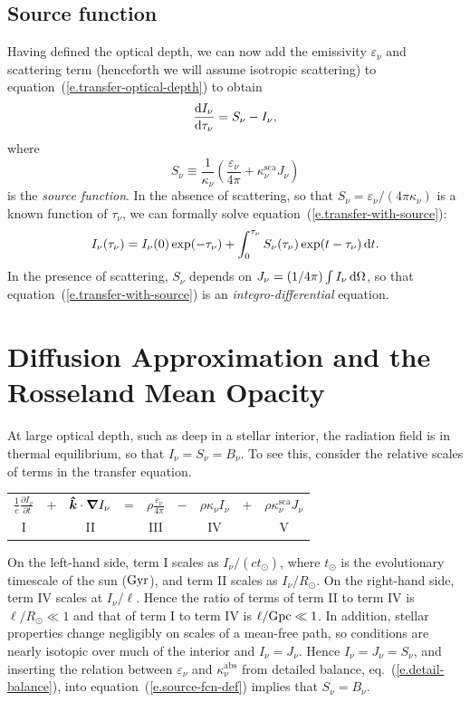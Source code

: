 \subsection{Source function}

Having defined the optical depth, we can now add the emissivity $\varepsilon_{\nu}$ and scattering term (henceforth we will assume isotropic scattering) to equation~(\ref{e.transfer-optical-depth}) to obtain
\begin{equation}\label{e.transfer-with-source}
\frac{\mathrm{d} I_{\nu}}{\mathrm{d} \tau_{\nu}} = S_{\nu}-I_{\nu},
\end{equation}
where 
\begin{equation}\label{e.source-fcn-def}
S_{\nu} \equiv \frac{1}{\kappa_{\nu}}\left(\frac{\varepsilon_{\nu}}{4\pi} + \kappa_{\nu}^{\mathrm{sca}}J_{\nu}\right)
\end{equation}
is the \emph{source function}. In the absence of scattering, so that $S_{\nu} = \varepsilon_{\nu}/(4\pi\kappa_{\nu})$ is a known function of $\tau_{\nu}$,
we can formally solve equation~(\ref{e.transfer-with-source}):
\[ I_{\nu}(\tau_{\nu}) = I_{\nu}(0)\exp(-\tau_{\nu}) + \int_{0}^{\tau_{\nu}} S_{\nu}(\tau_{\nu}) \exp(t-\tau_{\nu})\,\mathrm{d} t. \]
In the presence of scattering, $S_{\nu}$ depends on $J_{\nu} = (1/4\pi)\int I_{\nu}\,\mathrm{d}\Omega$, so that equation~(\ref{e.transfer-with-source}) is an \emph{integro-differential} equation.

\section[Diffusion Approximation]{Diffusion Approximation and the Rosseland Mean Opacity}

At large optical depth, such as deep in a stellar interior, the radiation field is in thermal equilibrium, so that $I_{\nu} = S_{\nu} = B_{\nu}$. To see this, consider the relative scales of terms in the transfer equation.
\begin{center}\begin{tabular}{ccccccccc}
$\displaystyle \frac{1}{c}\frac{\partial I_{\nu}}{\partial t}$ & + &
$\displaystyle  \bm{\hat{k}}\cdot\bm{\nabla} I_{\nu}$ & = &
$\displaystyle\rho\frac{\varepsilon_{\nu}}{4\pi} $ & $-$ & 
$\displaystyle \rho\kappa_{\nu} I_{\nu}$ & $+$ &
$\displaystyle \rho\kappa_{\nu}^{\mathrm{sca}} J_{\nu}$\\
I & & II & & III & & IV & & V
\end{tabular}
\end{center}
On the left-hand side, term I scales as $I_{\nu}/(c t_{\odot})$, where $t_{\odot}$ is the evolutionary timescale of the sun ($\mathrm{G}\mathrm{yr}$), and term II scales as $I_{\nu}/R_{\odot}$. On the right-hand side, term IV scales at $I_{\nu}/\ell$.  Hence the ratio of terms of term II to term IV is $\ell/R_{\odot}\ll 1$ and that of term I to term IV is $\ell/\mathrm{G}\mathrm{pc}\ll 1$. In addition, stellar properties change negligibly on scales of a mean-free path, so conditions are nearly isotopic over much of the interior and $I_{\nu} = J_{\nu}$. Hence $I_{\nu} = J_{\nu} = S_{\nu}$, and inserting the relation between $\varepsilon_{\nu}$ and $\kappa_{\nu}^{\mathrm{abs}}$ from detailed balance, eq.~(\ref{e.detail-balance}), into equation~(\ref{e.source-fcn-def}) implies that $S_{\nu} = B_{\nu}$.

